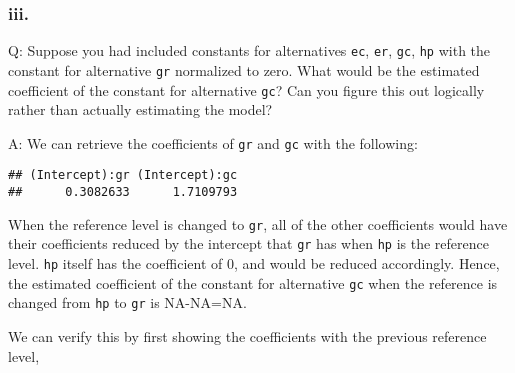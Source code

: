 \documentclass[
]{article}
\newenvironment{Shaded}{\begin{snugshade}}{\end{snugshade}}
\newcommand{\CommentTok}[1]{\textcolor[rgb]{0.56,0.35,0.01}{\textit{#1}}}
\newcommand{\DataTypeTok}[1]{\textcolor[rgb]{0.13,0.29,0.53}{#1}}
\newcommand{\DecValTok}[1]{\textcolor[rgb]{0.00,0.00,0.81}{#1}}
\newcommand{\KeywordTok}[1]{\textcolor[rgb]{0.13,0.29,0.53}{\textbf{#1}}}
\newcommand{\NormalTok}[1]{#1}
\newcommand{\OperatorTok}[1]{\textcolor[rgb]{0.81,0.36,0.00}{\textbf{#1}}}
\newcommand{\OtherTok}[1]{\textcolor[rgb]{0.56,0.35,0.01}{#1}}
\newcommand{\StringTok}[1]{\textcolor[rgb]{0.31,0.60,0.02}{#1}}
\begin{document}
\hypertarget{iii.-1}{%
\subsubsection{iii.}\label{iii.-1}}

Q: Suppose you had included constants for alternatives \texttt{ec},
\texttt{er}, \texttt{gc}, \texttt{hp} with the constant for alternative
\texttt{gr} normalized to zero. What would be the estimated coefficient
of the constant for alternative \texttt{gc}? Can you figure this out
logically rather than actually estimating the model?


A: We can retrieve the coefficients of \texttt{gr} and \texttt{gc} with
the following:

\begin{Shaded}
\end{Shaded}

\begin{verbatim}
## (Intercept):gr (Intercept):gc 
##      0.3082633      1.7109793
\end{verbatim}

When the reference level is changed to \texttt{gr}, all of the other
coefficients would have their coefficients reduced by the intercept that
\texttt{gr} has when \texttt{hp} is the reference level. \texttt{hp}
itself has the coefficient of 0, and would be reduced accordingly.
Hence, the estimated coefficient of the constant for alternative
\texttt{gc} when the reference is changed from \texttt{hp} to
\texttt{gr} is NA-NA=NA.

We can verify this by first showing the coefficients with the previous
reference level,
\end{document}
